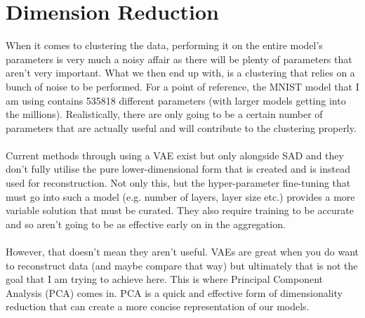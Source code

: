 \section{Dimension Reduction}
When it comes to clustering the data, performing it on the entire model's parameters is very much a noisy affair as there will be plenty of parameters that aren't very important.
What we then end up with, is a clustering that relies on a bunch of noise to be performed.
For a point of reference, the MNIST model that I am using contains 535818 different parameters (with larger models getting into the millions).
Realistically, there are only going to be a certain number of parameters that are actually useful and will contribute to the clustering properly.
\\ \\
Current methods through using a VAE exist but only alongside SAD and they don't fully utilise the pure lower-dimensional form that is created and is instead used for reconstruction.
Not only this, but the hyper-parameter fine-tuning that must go into such a model (e.g. number of layers, layer size etc.) provides a more variable solution that must be curated.
They also require training to be accurate and so aren't going to be as effective early on in the aggregation.
\\ \\
However, that doesn't mean they aren't useful.
VAEs are great when you do want to reconstruct data (and maybe compare that way) but ultimately that is not the goal that I am trying to achieve here.
This is where Principal Component Analysis (PCA) comes in.
PCA is a quick and effective form of dimensionality reduction that can create a more concise representation of our models.

